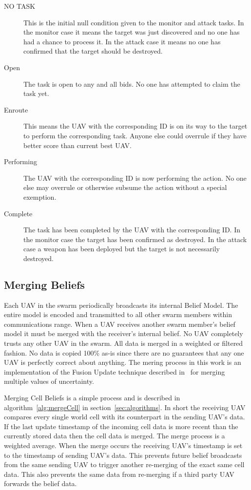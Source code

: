 \begin{multicols*}{2}
\begin{description}
	\item [NO TASK] This is the initial null condition given to the monitor and attack tasks.  In the monitor case it means the target was just discovered and no one has had a chance to process it.  In the attack case it means no one has confirmed that the target should be destroyed.
	\item [Open] The task is open to any and all bids.  No one has attempted to claim the task yet.
	\item [Enroute] This means the UAV with the corresponding ID is on its way to the target to perform the corresponding task.  Anyone else could overrule if they have better score than current best UAV.
	\item [Performing] The UAV with the corresponding ID is now performing the action.  No one else may overrule or otherwise subsume the action without a special exemption.%
	\item [Complete] The task has been completed by the UAV with the corresponding ID.  In the monitor case the target has been confirmed as destroyed.  In the attack case a weapon has been deployed but the target is not necessarily destroyed.
\end{description}

\subsection{Merging Beliefs}
Each UAV in the swarm periodically broadcasts its internal Belief Model.  The entire model is encoded and transmitted to all other swarm members within communications range.  When a UAV receives another swarm member's belief model it must be merged with the receiver's internal belief.  No UAV completely trusts any other UAV in the swarm.  All data is merged in a weighted or filtered fashion.  No data is copied 100\% as-is since there are no guarantees that any one UAV is perfectly correct about anything.  The mering process in this work is an implementation of the Fusion Update technique described in~\cite{shem} for merging multiple values of uncertainty.


Merging Cell Beliefs is a simple process and is described in algorithm~\ref{alg:mergeCell} in section~\ref{sec:algorithms}.   In short the receiving UAV compares every single world cell with its counterpart in the sending UAV's data.  If the last update timestamp of the incoming cell data is more recent than the currently stored data then the cell data is merged.  The merge process is a weighted average.  When the merge occurs the receiving UAV's timestamp is set to the timestamp of sending UAV's data.  This prevents future belief broadcasts from the same sending UAV to trigger another re-merging of the exact same cell data.  This also prevents the same data from re-merging if a third party UAV forwards the belief data. 


\end{multicols*}
